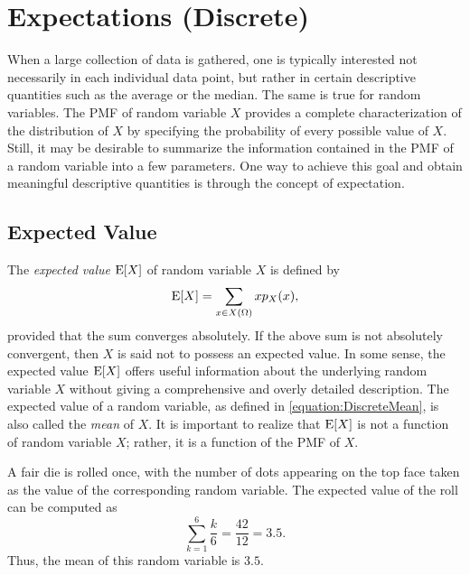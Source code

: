 \chapter{Expectations (Discrete)}
\label{chapter:ExpectationsDiscrete}

When a large collection of data is gathered, one is typically interested not necessarily in each individual data point, but rather in certain descriptive quantities such as the average or the median.
The same is true for random variables.
The PMF of random variable $X$ provides a complete characterization of the distribution of $X$ by specifying the probability of every possible value of $X$.
Still, it may be desirable to summarize the information contained in the PMF of a random variable into a few parameters.
One way to achieve this goal and obtain meaningful descriptive quantities is through the concept of expectation.


\section{Expected Value}

The \emph{expected value} $\mathrm{E} [X]$ of random variable $X$ is defined by 
\begin{equation} \label{equation:DiscreteMean}
\mathrm{E} [X] = \sum_{x \in X(\Omega)} x p_X (x) ,
\end{equation}
provided that the sum converges absolutely.
If the above sum is not absolutely convergent, then $X$ is said not to possess an expected value.
In some sense, the expected value $\mathrm{E} [X]$ offers useful information about the underlying random variable $X$ without giving a comprehensive and overly detailed description.
The expected value of a random variable, as defined in \eqref{equation:DiscreteMean}, is also called the \emph{mean} of $X$. 
It is important to realize that $\mathrm{E} [X]$ is not a function of random variable $X$; rather, it is a function of the PMF of $X$.

\begin{example}
A fair die is rolled once, with the number of dots appearing on the top face taken as the value of the corresponding random variable.
The expected value of the roll can be computed as
\begin{equation*}
\sum_{k=1}^6 \frac{k}{6} = \frac{42}{12} = 3.5 .
\end{equation*}
Thus, the mean of this random variable is $3.5$.
\end{example}

